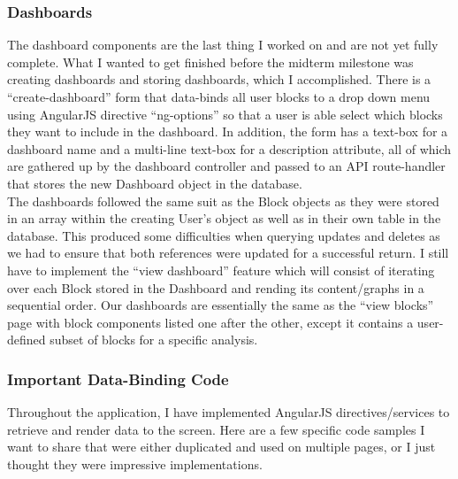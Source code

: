 \documentclass[letterpaper,10pt,serif,draftclsnofoot,onecolumn,compsoc,titlepage]{IEEEtran}
\begin{document}
\subsubsection{Dashboards} 
The dashboard components are the last thing I worked on and are not yet fully complete. What I wanted to get finished before the midterm milestone was creating dashboards and storing dashboards, which I accomplished. There is a ``create-dashboard'' form that data-binds all user blocks to a drop down menu using AngularJS directive ``ng-options'' so that a user is able select which blocks they want to include in the dashboard. In addition, the form has a text-box for a dashboard name and a multi-line text-box for a description attribute, all of which are gathered up by the dashboard controller and passed to an API route-handler that stores the new Dashboard object in the database.\\

\noindent The dashboards followed the same suit as the Block objects as they were stored in an array within the creating User's object as well as in their own table in the database. This produced some difficulties when querying updates and deletes as we had to ensure that both references were updated for a successful return. I still have to implement the ``view dashboard'' feature which will consist of iterating over each Block stored in the Dashboard and rending its content/graphs in a sequential order. Our dashboards are essentially the same as the ``view blocks'' page with block components listed one after the other, except it contains a user-defined subset of blocks for a specific analysis. 
\subsubsection{Important Data-Binding Code}
Throughout the application, I have implemented AngularJS directives/services to retrieve and render data to the screen. Here are a few specific code samples I want to share that were either duplicated and used on multiple pages, or I just thought they were impressive implementations.\\
\end{document}
